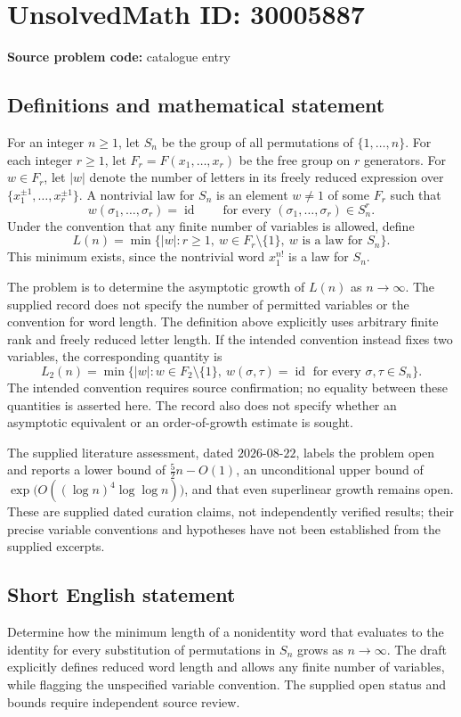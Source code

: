 \documentclass[11pt]{article}
\begin{document}
\section*{UnsolvedMath ID: 30005887}
\textbf{Source problem code:} catalogue entry
\subsection{Definitions and mathematical statement}
For an integer \(n\geq 1\), let \(S_n\) be the group of all permutations of \(\{1,\ldots,n\}\). For each integer \(r\geq 1\), let \(F_r=F(x_1,\ldots,x_r)\) be the free group on \(r\) generators. For \(w\in F_r\), let \(|w|\) denote the number of letters in its freely reduced expression over \(\{x_1^{\pm1},\ldots,x_r^{\pm1}\}\). A nontrivial law for \(S_n\) is an element \(w\neq 1\) of some \(F_r\) such that
\[
 w(\sigma_1,\ldots,\sigma_r)=\operatorname{id}
 \qquad\text{for every }(\sigma_1,\ldots,\sigma_r)\in S_n^r.
\]
Under the convention that any finite number of variables is allowed, define
\[
 L(n)=\min\bigl\{|w|:r\geq 1,\ w\in F_r\setminus\{1\},\ w\text{ is a law for }S_n\bigr\}.
\]
This minimum exists, since the nontrivial word \(x_1^{n!}\) is a law for \(S_n\).

The problem is to determine the asymptotic growth of \(L(n)\) as \(n\to\infty\). The supplied record does not specify the number of permitted variables or the convention for word length. The definition above explicitly uses arbitrary finite rank and freely reduced letter length. If the intended convention instead fixes two variables, the corresponding quantity is
\[
 L_2(n)=\min\bigl\{|w|:w\in F_2\setminus\{1\},\ w(\sigma,\tau)=\operatorname{id}\text{ for every }\sigma,\tau\in S_n\bigr\}.
\]
The intended convention requires source confirmation; no equality between these quantities is asserted here. The record also does not specify whether an asymptotic equivalent or an order-of-growth estimate is sought.

The supplied literature assessment, dated \(2026\text{-}08\text{-}22\), labels the problem open and reports a lower bound of \(\tfrac52 n-O(1)\), an unconditional upper bound of \(\exp\!\bigl(O((\log n)^4\log\log n)\bigr)\), and that even superlinear growth remains open. These are supplied dated curation claims, not independently verified results; their precise variable conventions and hypotheses have not been established from the supplied excerpts.
\subsection{Short English statement}
Determine how the minimum length of a nonidentity word that evaluates to the identity for every substitution of permutations in \(S_n\) grows as \(n\to\infty\). The draft explicitly defines reduced word length and allows any finite number of variables, while flagging the unspecified variable convention. The supplied open status and bounds require independent source review.
\end{document}
